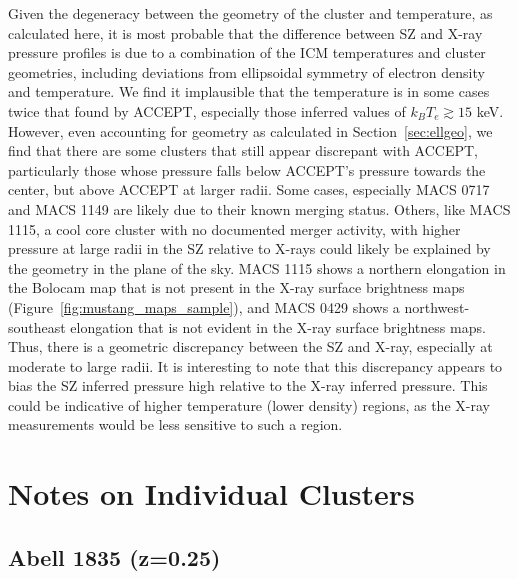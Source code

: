 \documentclass[iop,numberedappendix,apj]{emulateapj}
\begin{document}
Given the degeneracy between the geometry of the cluster and temperature, as calculated here, it is most probable
that the difference between SZ and X-ray pressure profiles is due to a combination of the ICM temperatures and
cluster geometries, including deviations from ellipsoidal symmetry of electron density and temperature. 
We find it implausible
that the temperature is in some cases twice that found by ACCEPT, especially those inferred values of 
$k_B T_e \gtrsim 15$ keV. However, even accounting for geometry as calculated in Section~\ref{sec:ellgeo},
we find that there are some clusters that still appear discrepant with ACCEPT, particularly those whose pressure
falls below ACCEPT's pressure towards the center, but above ACCEPT at larger radii.  Some cases, especially
MACS 0717 and MACS 1149 are likely due to their known merging status. Others, like MACS 1115, a cool core cluster
with no documented merger activity, with higher pressure at large radii in the SZ relative to X-rays could likely 
be explained by the geometry in the plane of the sky. MACS 1115
shows a northern elongation in the Bolocam map that is not present in the X-ray surface brightness maps
(Figure~\ref{fig:mustang_maps_sample}), 
and MACS 0429 shows a northwest-southeast elongation that is not evident
in the X-ray surface brightness maps. Thus, there is a geometric discrepancy between the SZ and X-ray, especially
at moderate to large radii. It is interesting to note that this discrepancy appears to bias the SZ inferred pressure 
high relative to the X-ray inferred pressure. This could be indicative of higher temperature (lower density) regions,
as the X-ray measurements would be less sensitive to such a region.

\section{Notes on Individual Clusters}
\label{sec:ind_notes}


\subsection{Abell 1835 (z=0.25)}
\label{sec:results_a1835}
\end{document}

